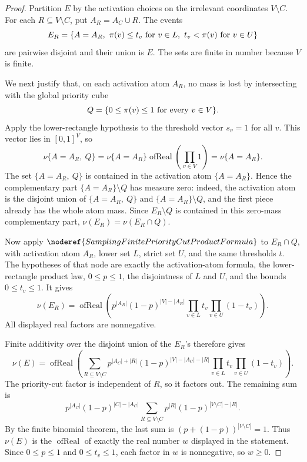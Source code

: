 \begin{proof}
Partition \(E\) by the activation choices on the irrelevant coordinates
\(V\setminus C\).  For each \(R\subseteq V\setminus C\), put
\(A_R=A_C\cup R\).  The events
\[
E_R=\{A=A_R,\ \pi(v)\le t_v\hbox{ for }v\in L,\ 
       t_v<\pi(v)\hbox{ for }v\in U\}
\]
are pairwise disjoint and their union is \(E\).  The sets are finite in number
because \(V\) is finite.

We next justify that, on each activation atom \(A_R\), no mass is lost by
intersecting with the global priority cube
\[
Q=\{0\le \pi(v)\le 1\hbox{ for every }v\in V\}.
\]
Apply the lower-rectangle hypothesis to the threshold vector \(s_v=1\) for
all \(v\).  This vector lies in \([0,1]^V\), so
\[
\nu\{A=A_R,\ Q\}
=\nu\{A=A_R\}\operatorname{ofReal}\!\left(\prod_{v\in V}1\right)
=\nu\{A=A_R\}.
\]
The set \(\{A=A_R,\ Q\}\) is contained in the activation atom
\(\{A=A_R\}\).  Hence the complementary part
\(\{A=A_R\}\setminus Q\) has measure zero: indeed, the activation atom is the
disjoint union of \(\{A=A_R,\ Q\}\) and \(\{A=A_R\}\setminus Q\), and the first
piece already has the whole atom mass.  Since \(E_R\setminus Q\) is contained
in this zero-mass complementary part, \(\nu(E_R)=\nu(E_R\cap Q)\).

Now apply \(\noderef{SamplingFinitePriorityCutProductFormula}\) to
\(E_R\cap Q\), with activation atom \(A_R\), lower set \(L\), strict set
\(U\), and the same thresholds \(t\).  The hypotheses of that node are exactly
the activation-atom formula, the lower-rectangle product law, \(0\le p\le1\),
the disjointness of \(L\) and \(U\), and the bounds \(0\le t_v\le1\).  It gives
\[
\nu(E_R)=\operatorname{ofReal}\!\left(
p^{|A_R|}(1-p)^{|V|-|A_R|}
\prod_{v\in L}t_v\prod_{v\in U}(1-t_v)\right).
\]
All displayed real factors are nonnegative.

Finite additivity over the disjoint union of the \(E_R\)'s therefore gives
\[
\nu(E)=\operatorname{ofReal}\!\left(
\sum_{R\subseteq V\setminus C}
p^{|A_C|+|R|}(1-p)^{|V|-|A_C|-|R|}
\prod_{v\in L}t_v\prod_{v\in U}(1-t_v)\right).
\]
The priority-cut factor is independent of \(R\), so it factors out.  The
remaining sum is
\[
p^{|A_C|}(1-p)^{|C|-|A_C|}
\sum_{R\subseteq V\setminus C}p^{|R|}(1-p)^{|V\setminus C|-|R|}.
\]
By the finite binomial theorem, the last sum is
\((p+(1-p))^{|V\setminus C|}=1\).  Thus \(\nu(E)\) is the
\(\operatorname{ofReal}\) of exactly the real number \(w\) displayed in the
statement.  Since \(0\le p\le1\) and \(0\le t_v\le1\), each factor in \(w\)
is nonnegative, so \(w\ge0\).
\end{proof}
